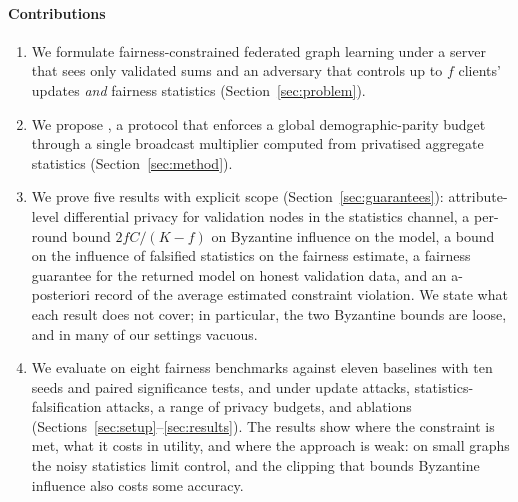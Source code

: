 \paragraph{Contributions}
\begin{enumerate}
\item We formulate fairness-constrained federated graph learning under a server that sees only validated sums and an adversary that controls up to $f$ clients' updates \emph{and} fairness statistics (Section~\ref{sec:problem}).
\item We propose \clamp{}, a protocol that enforces a global demographic-parity budget through a single broadcast multiplier computed from privatised aggregate statistics (Section~\ref{sec:method}).
\item We prove five results with explicit scope (Section~\ref{sec:guarantees}): attribute-level differential privacy for validation nodes in the statistics channel, a per-round bound $2fC/(K-f)$ on Byzantine influence on the model, a bound on the influence of falsified statistics on the fairness estimate, a fairness guarantee for the returned model on honest validation data, and an a-posteriori record of the average estimated constraint violation. We state what each result does not cover; in particular, the two Byzantine bounds are loose, and in many of our settings vacuous.
\item We evaluate \clamp{} on eight fairness benchmarks against eleven baselines with ten seeds and paired significance tests, and under update attacks, statistics-falsification attacks, a range of privacy budgets, and ablations (Sections~\ref{sec:setup}--\ref{sec:results}). The results show where the constraint is met, what it costs in utility, and where the approach is weak: on small graphs the noisy statistics limit control, and the clipping that bounds Byzantine influence also costs some accuracy.
\end{enumerate}
